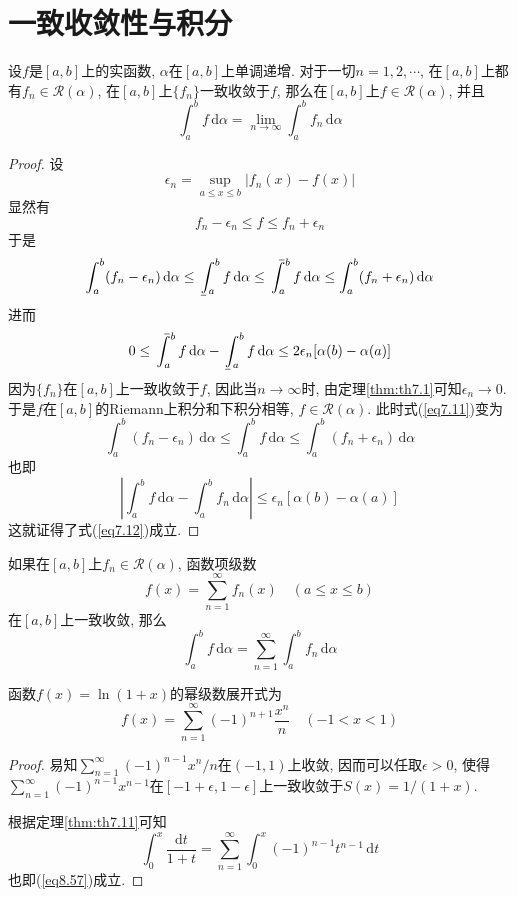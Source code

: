\documentclass[cn,12pt,math=mtpro2,citestyle=gb7714-2015,bibstyle=gb7714-2015,twocol]{elegantbook}
\newcommand{\da}{\,\text{d}\alpha}
\newcommand{\dt}{\,\text{d}t}
\newcommand{\limn}{\lim_{n\to\infty}}
\def\upint{\mathchoice%
    {\mkern13mu\overline{\vphantom{\intop}\mkern7mu}\mkern-20mu}%
    {\mkern7mu\overline{\vphantom{\intop}\mkern7mu}\mkern-14mu}%
    {\mkern7mu\overline{\vphantom{\intop}\mkern7mu}\mkern-14mu}%
    {\mkern7mu\overline{\vphantom{\intop}\mkern7mu}\mkern-14mu}%
  \int}
\def\lowint{\mkern3mu\underline{\vphantom{\intop}\mkern7mu}\mkern-10mu\int}
\begin{document}
\section{一致收敛性与积分}
\begin{theorem}\label{thm:th7.11}
  设$f$是$[a,b]$上的实函数, $\alpha$在$[a,b]$上单调递增. 对于一切$n=1,2,\cdots$, 在$[a,b]$上都有$f_n\in\mathscr{R}(\alpha)$, 在$[a,b]$上$\{f_n\}$一致收敛于$f$, 那么在$[a,b]$上$f\in\mathscr{R}(\alpha)$, 并且
  \begin{equation}\label{eq7.12}
   \int_{a}^{b}f\da=\limn \int_{a}^{b}f_n\da
  \end{equation}
\end{theorem}
\begin{proof}
  设
  $$\epsilon_n=\sup_{a\leq x\leq b}|f_n(x)-f(x)|$$
  显然有
  $$f_n-\epsilon_n\leq f\leq f_n+\epsilon_n$$
  于是
  \begin{equation}\label{eq7.11}
    \int_{a}^{b}(f_n-\epsilon_n)\da\leq\lowint_a^b f\da\leq\upint_a^b f\da \leq\int_{a}^{b}(f_n+\epsilon_n)\da
  \end{equation}
  进而
  $$0\leq\upint_a^b f\da-\lowint_a^b f\da\leq 2\epsilon_n[\alpha(b)-\alpha(a)]$$
  因为$\{f_n\}$在$[a,b]$上一致收敛于$f$, 因此当$n\to\infty$时, 由定理\ref{thm:th7.1}可知$\epsilon_n\to0$. 于是$f$在$[a,b]$的Riemann上积分和下积分相等, $f\in\mathscr{R}(\alpha)$. 此时式(\ref{eq7.11})变为
  $$\int_{a}^{b}(f_n-\epsilon_n)\da\leq\int_a^b f\da \leq\int_{a}^{b}(f_n+\epsilon_n)\da$$
  也即
  $$\left|\int_{a}^{b}f\da-\int_{a}^{b}f_n\da\right|\leq\epsilon_n[\alpha(b)-\alpha(a)]$$
  这就证得了式(\ref{eq7.12})成立.
\end{proof}
\begin{corollary}
如果在$[a,b]$上$f_n\in\mathscr{R}(\alpha)$, 函数项级数
$$f(x)=\sum_{n=1}^{\infty}f_n(x)\quad(a\leq x\leq b)$$
在$[a,b]$上一致收敛, 那么
$$\int_{a}^{b}f\da=\sum_{n=1}^{\infty}\int_{a}^{b}f_n\da$$
\end{corollary}
\begin{example}
函数$f(x)=\ln(1+x)$的幂级数展开式为
\begin{equation}\label{eq8.57}
  f(x)=\sum_{n=1}^{\infty}(-1)^{n+1}\frac{x^n}{n}\quad(-1<x<1)
\end{equation}
\end{example}
\begin{proof}
  易知$\sum_{n=1}^{\infty}(-1)^{n-1}x^n/n$在$(-1,1)$上收敛, 因而可以任取$\epsilon>0$, 使得$\sum_{n=1}^{\infty}(-1)^{n-1}x^{n-1}$在$[-1+\epsilon,1-\epsilon]$上一致收敛于$S(x)=\displaystyle 1/(1+x)$.

  根据定理\ref{thm:th7.11}可知
  $$\int_{0}^{x}\frac{\text{d}t}{1+t}=\sum_{n=1}^{\infty}\int_{0}^{x}(-1)^{n-1}t^{n-1}\dt$$
  也即(\ref{eq8.57})成立.

\end{proof}
\end{document}
